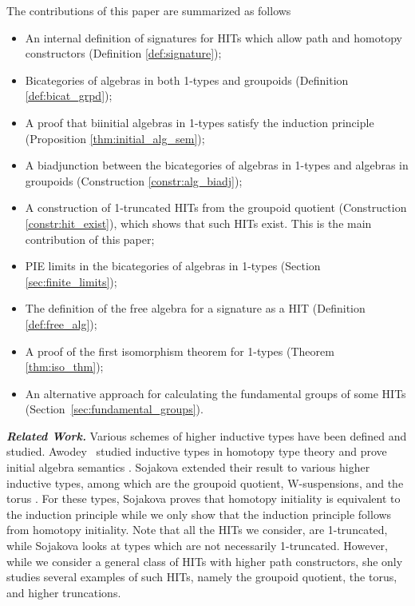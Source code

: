 The contributions of this paper are summarized as follows
\begin{itemize}
	\item An internal definition of signatures for HITs which allow path and homotopy constructors (Definition \ref{def:signature});
	\item Bicategories of algebras in both 1-types and groupoids (Definition \ref{def:bicat_grpd});
	\item A proof that biinitial algebras in 1-types satisfy the induction principle (Proposition \ref{thm:initial_alg_sem});
	\item A biadjunction between the bicategories of algebras in 1-types and algebras in groupoids (Construction \ref{constr:alg_biadj});
	\item A construction of 1-truncated HITs from the groupoid quotient (Construction \ref{constr:hit_exist}),
	which shows that such HITs exist.
	This is the main contribution of this paper;
        \item PIE limits in the bicategories of algebras in 1-types (Section \ref{sec:finite_limits});
        \item The definition of the free algebra for a signature as a HIT (Definition \ref{def:free_alg});
        \item A proof of the first isomorphism theorem for 1-types (Theorem \ref{thm:iso_thm});
        \item An alternative approach for calculating the fundamental groups of some HITs (Section~\ref{sec:fundamental_groups}).
\end{itemize}
\emph{\textbf{Related Work.}}
Various schemes of higher inductive types have been defined and studied.
Awodey \etal \ studied inductive types in homotopy type theory and prove initial
algebra semantics \cite{AwodeyGS12}.
Sojakova extended their result to various higher inductive types, among which
are the groupoid quotient, W-suspensions, and the torus \cite{Sojakova15,sojakovaPhD}.
For these types, Sojakova proves that homotopy initiality is equivalent to the induction principle while we only show that the induction principle follows from homotopy initiality.
Note that all the HITs we consider, are 1-truncated, while Sojakova looks at types which are not necessarily 1-truncated.
However, while we consider a general class of HITs with higher path constructors, she only studies several examples of such HITs, namely the groupoid quotient, the torus, and higher truncations.
